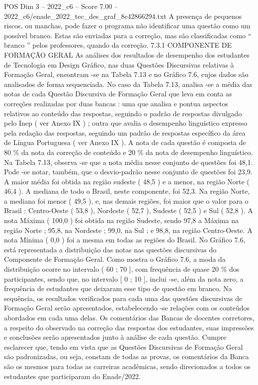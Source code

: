 \begin{textsample}{POS Dim 3 – 2022\_c6 – Score 7.00 – 2022\_c6/enade\_2022\_tec\_des\_graf\_8c42866294.txt}
A presença de pequenos riscos, ou manchas, pode fazer o programa não identificar uma questão como um possível branco.
Estas são enviadas para a correção, mas são classificadas como “ branco ” pelos professores, quando da correção. 7.3.1 COMPONENTE DE FORMAÇÃO GERAL As análises dos resultados de desempenho dos estudantes de Tecnologia em Design Gráfico, nas duas Questões Discursivas relativas à Formação Geral, encontram -se na Tabela 7.13 e no Gráfico 7.6, cujos dados são analisados de forma sequenciada.
No caso da Tabela 7.13, analisa -se a média das notas de cada Questão Discursiva de Formação Geral que leva em conta as correções realizadas por duas bancas : uma que analisa e pontua aspectos relativos ao conteúdo das respostas, seguindo o padrão de respostas divulgado pelo Inep ( ver Anexo IX ) ; outra que avalia o desempenho linguístico expresso pela redação das respostas, seguindo um padrão de respostas específico da área de Língua Portuguesa ( ver Anexo IX ).
A nota de cada questão é composta de 80 \% da nota da correção de conteúdo e 20 \% da nota de desempenho linguístico.
Na Tabela 7.13, observa -se que a nota média nesse conjunto de questões foi 48,1.
Pode -se notar, também, que o desvio-padrão nesse conjunto de questões foi 23,9.
A maior média foi obtida na região sudeste ( 48,5 ) e a menor, na região Norte ( 46,4 ).
A mediana de todo o Brasil, neste componente, foi 52,3.
Na região Norte, a mediana foi menor ( 49,5 ), e, nas demais regiões, foi maior que o valor para o Brasil : Centro-Oeste ( 53,8 ), Nordeste ( 52,7 ), Sudeste ( 52,5 ) e Sul ( 52,8 ).
A nota Máxima ( 100,0 ) foi obtida na região Sudeste, sendo 97,8 a Máxima na região Norte ; 95,8, na Nordeste ; 99,0, na Sul ; e 98,8, na região Centro-Oeste.
A nota Mínima ( 0,0 ) foi a mesma em todas as regiões do Brasil.
No Gráfico 7.6, está representada a distribuição das notas nas questões discursivas do Componente de Formação Geral.
Como mostra o Gráfico 7.6, a moda da distribuição ocorre no intervalo ( 60 ; 70 ], com frequência de quase 20 \% dos participantes, sendo que, no intervalo [ 0 ; 10 ], inclui -se, além da nota zero, a frequência de estudantes que deixaram esse tipo de questão em branco.
Na sequência, os resultados verificados para cada uma das questões discursivas de Formação Geral serão apresentados, estabelecendo -se relações com os conteúdos abordados em cada uma delas.
Os comentários das Bancas de docentes corretores, a respeito do observado na correção das respostas dos estudantes, suas impressões e conclusões serão apresentados junto à análise de cada questão.
Cumpre esclarecer que, tendo em vista que as Questões Discursivas de Formação Geral são padronizadas, ou seja, constam de todas as provas, os comentários da Banca são os mesmos para todas as carreiras acadêmicas, sendo direcionados a todos os estudantes que participaram do Enade/2022.

\end{textsample}
